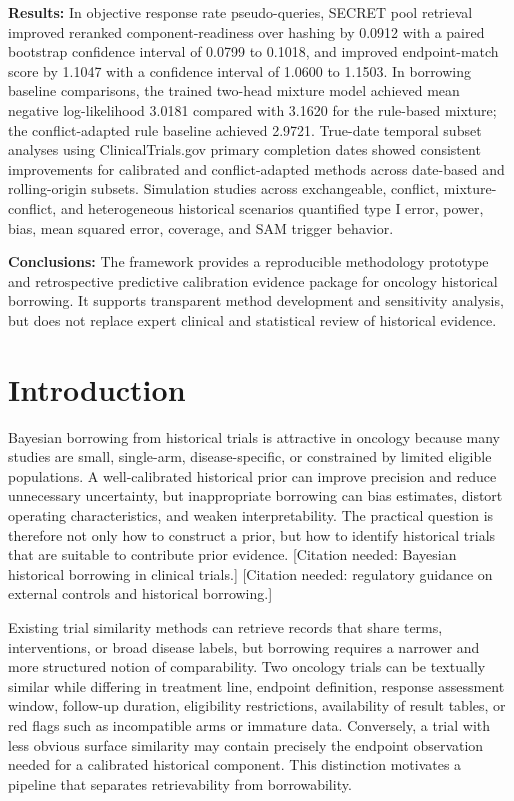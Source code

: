 \documentclass[11pt]{article}
\begin{document}
\textbf{Results:}
In objective response rate pseudo-queries, SECRET pool retrieval improved reranked component-readiness over hashing by 0.0912 with a paired bootstrap confidence interval of 0.0799 to 0.1018, and improved endpoint-match score by 1.1047 with a confidence interval of 1.0600 to 1.1503. In borrowing baseline comparisons, the trained two-head mixture model achieved mean negative log-likelihood 3.0181 compared with 3.1620 for the rule-based mixture; the conflict-adapted rule baseline achieved 2.9721. True-date temporal subset analyses using ClinicalTrials.gov primary completion dates showed consistent improvements for calibrated and conflict-adapted methods across date-based and rolling-origin subsets. Simulation studies across exchangeable, conflict, mixture-conflict, and heterogeneous historical scenarios quantified type I error, power, bias, mean squared error, coverage, and SAM trigger behavior.

\textbf{Conclusions:}
The framework provides a reproducible methodology prototype and retrospective predictive calibration evidence package for oncology historical borrowing. It supports transparent method development and sensitivity analysis, but does not replace expert clinical and statistical review of historical evidence.

\section{Introduction}

Bayesian borrowing from historical trials is attractive in oncology because many studies are small, single-arm, disease-specific, or constrained by limited eligible populations. A well-calibrated historical prior can improve precision and reduce unnecessary uncertainty, but inappropriate borrowing can bias estimates, distort operating characteristics, and weaken interpretability. The practical question is therefore not only how to construct a prior, but how to identify historical trials that are suitable to contribute prior evidence. [Citation needed: Bayesian historical borrowing in clinical trials.] [Citation needed: regulatory guidance on external controls and historical borrowing.]

Existing trial similarity methods can retrieve records that share terms, interventions, or broad disease labels, but borrowing requires a narrower and more structured notion of comparability. Two oncology trials can be textually similar while differing in treatment line, endpoint definition, response assessment window, follow-up duration, eligibility restrictions, availability of result tables, or red flags such as incompatible arms or immature data. Conversely, a trial with less obvious surface similarity may contain precisely the endpoint observation needed for a calibrated historical component. This distinction motivates a pipeline that separates retrievability from borrowability.
\end{document}
